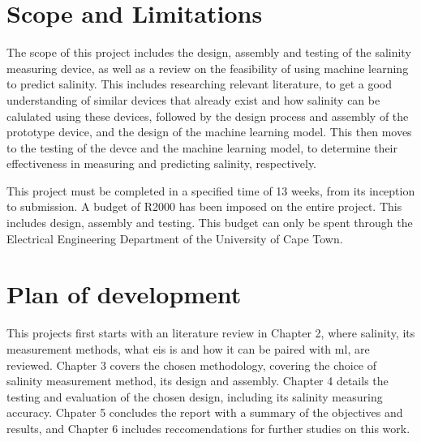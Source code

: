 \section{Scope and Limitations}
The scope of this project includes the design, assembly and testing of the salinity measuring device, as well as a review on the feasibility of using machine learning to predict salinity.
This includes researching relevant literature, to get a good understanding of similar devices that already exist and how salinity can be calulated using these devices, followed by the design process and assembly of the prototype device, and the design of the machine learning model.
This then moves to the testing of the devce and the machine learning model, to determine their effectiveness in measuring and predicting salinity, respectively.

This project must be completed in a specified time of 13 weeks, from its inception to submission.
A budget of R2000 has been imposed on the entire project. This includes design, assembly and testing.
This budget can only be spent through the Electrical Engineering Department of the University of Cape Town. 


\section{Plan of development}
This projects first starts with an literature review in Chapter 2, where salinity, its measurement methods, what \gls{eis} is and how it can be paired with \gls{ml}, are reviewed.
Chapter 3 covers the chosen methodology, covering the choice of salinity measurement method, its design and assembly.
Chapter 4 details the testing and evaluation of the chosen design, including its salinity measuring accuracy.
Chpater 5 concludes the report with a summary of the objectives and results, and Chapter 6 includes reccomendations for further studies on this work.
